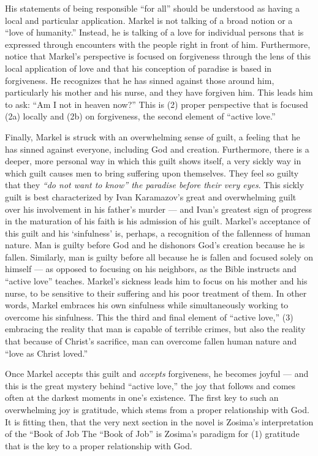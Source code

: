 His statements of being responsible ``for all'' should be understood as having a local and particular application. Markel is not talking of a broad notion or a ``love of humanity.'' Instead, he is talking of a love for individual persons that is expressed through encounters with the people right in front of him. Furthermore, notice that Markel's perspective is focused on forgiveness through the lens of this local application of love and that his conception of paradise is based in forgiveness. He recognizes that he has sinned against those around him, particularly his mother and his nurse, and they have forgiven him. This leads him to ask: ``Am I not in heaven now?'' This is (2) proper perspective that is focused (2a) locally and (2b) on forgiveness, the second element of ``active love.''

Finally, Markel is struck with an overwhelming sense of guilt, a feeling that he has sinned against everyone, including God and creation. Furthermore, there is a deeper, more personal way in which this guilt shows itself, a very sickly way in which guilt causes men to bring suffering upon themselves. They feel so guilty that they \emph{``do not want to know'' the paradise before their very eyes}. This sickly guilt is best characterized by Ivan Karamazov's great and overwhelming guilt over his involvement in his father's murder --- and Ivan's greatest sign of progress in the maturation of his faith is his admission of his guilt. Markel's acceptance of this guilt and his `sinfulness' is, perhaps, a recognition of the fallenness of human nature. Man is guilty before God and he dishonors God's creation because he is fallen. Similarly, man is guilty before all because he is fallen and focused solely on himself --- as opposed to focusing on his neighbors, as the Bible instructs and ``active love'' teaches. Markel's sickness leads him to focus on his mother and his nurse, to be sensitive to their suffering and his poor treatment of them. In other words, Markel embraces his own sinfulness while simultaneously working to overcome his sinfulness. This the third and final element of ``active love,'' (3) embracing the reality that man is capable of terrible crimes, but also the reality that because of Christ's sacrifice, man can overcome fallen human nature and ``love as Christ loved.''

Once Markel accepts this guilt and \emph{accepts} forgiveness, he becomes joyful --- and this is the great mystery behind ``active love,'' the joy that follows and comes often at the darkest moments in one's existence. The first key to such an overwhelming joy is gratitude, which stems from a proper relationship with God. It is fitting then, that the very next section in the novel is Zosima's interpretation of the ``Book of Job The ``Book of Job'' is Zosima's paradigm for (1) gratitude that is the key to a proper relationship with God.

